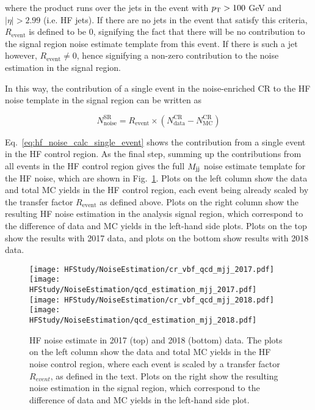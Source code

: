 where the product runs over the jets in the event with $p_{\textrm{T}} > 100$ GeV and $|\eta| > 2.99$ (i.e. HF jets). If there are no
jets in the event that satisfy this criteria, $R_{\textrm{event}}$ is defined to be $0$, signifying the fact that there will be no contribution
to the signal region noise estimate template from this event. If there is such a jet however, $R_{\textrm{event}} \neq 0$, hence signifying
a non-zero contribution to the noise estimation in the signal region.

In this way, the contribution of a single event in the noise-enriched CR to the HF noise template in the signal region can be written as

\begin{equation}
    N_{\textrm{noise}}^{\textrm{SR}} = R_{\textrm{event}} \times (N_{\textrm{data}}^{\textrm{CR}} - N_{\textrm{MC}}^{\textrm{CR}})
    \label{eq:hf_noise_calc_single_event}
\end{equation}

Eq.~\ref{eq:hf_noise_calc_single_event} shows the contribution from a single event in the HF control region.
As the final step, summing up the contributions from all events in the HF control region gives the full $M_{\textrm{jj}}$ 
noise estimate template for the HF noise, which are shown in Fig.~\ref{fig:hf_estimation_mtr}.
Plots on the left column show the data and total MC
yields in the HF control region, each event being already scaled by the transfer factor 
$R_{\textrm{event}}$ as defined above. 
Plots on the right column show the resulting HF noise estimation in the analysis
signal region, which correspond to the difference of data and MC yields in the left-hand side plots.
Plots on the top show the results with 2017 data, and plots on the bottom show results with 2018 data.

\begin{figure}[h!]
    \centering
        \texttt{[image: HFStudy/NoiseEstimation/cr\_vbf\_qcd\_mjj\_2017.pdf]}
        \texttt{[image: HFStudy/NoiseEstimation/qcd\_estimation\_mjj\_2017.pdf]} \\ 
        \texttt{[image: HFStudy/NoiseEstimation/cr\_vbf\_qcd\_mjj\_2018.pdf]}
        \texttt{[image: HFStudy/NoiseEstimation/qcd\_estimation\_mjj\_2018.pdf]}
    \caption{HF noise estimate in 2017 (top) and 2018 (bottom) data. The plots on the left column show the data and total MC yields in the HF noise control region,
      where each event is scaled by a transfer factor $R_{event}$, as defined in the text. 
      Plots on the right show the resulting noise estimation in the signal region, which correspond to the difference of data and MC
      yields in the left-hand side plot.
    }
    \label{fig:hf_estimation_mtr}
\end{figure}

